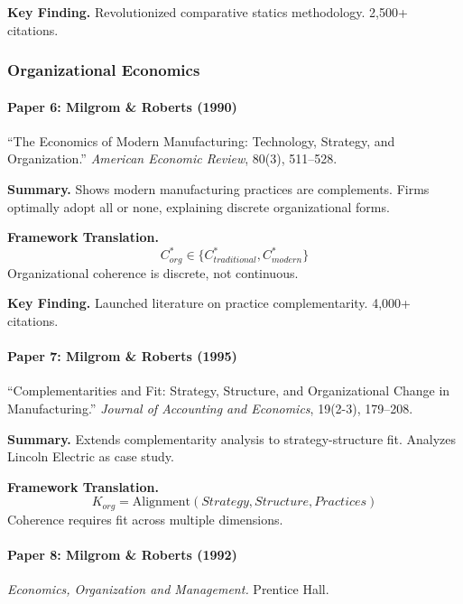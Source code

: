 \textbf{Key Finding.}
Revolutionized comparative statics methodology. 2,500+ citations.

\subsubsection{Organizational Economics}

\paragraph{Paper 6: Milgrom \& Roberts (1990)}

``The Economics of Modern Manufacturing: Technology, Strategy, and Organization.''
\textit{American Economic Review}, 80(3), 511--528.

\textbf{Summary.}
Shows modern manufacturing practices are complements. Firms optimally adopt 
all or none, explaining discrete organizational forms.

\textbf{Framework Translation.}
\begin{equation}
C^*_{org} \in \{C^*_{traditional}, C^*_{modern}\}
\end{equation}
Organizational coherence is discrete, not continuous.

\textbf{Key Finding.}
Launched literature on practice complementarity. 4,000+ citations.

\paragraph{Paper 7: Milgrom \& Roberts (1995)}

``Complementarities and Fit: Strategy, Structure, and Organizational Change in Manufacturing.''
\textit{Journal of Accounting and Economics}, 19(2-3), 179--208.

\textbf{Summary.}
Extends complementarity analysis to strategy-structure fit. 
Analyzes Lincoln Electric as case study.

\textbf{Framework Translation.}
\begin{equation}
K_{org} = \text{Alignment}(Strategy, Structure, Practices)
\end{equation}
Coherence requires fit across multiple dimensions.

\paragraph{Paper 8: Milgrom \& Roberts (1992)}

\textit{Economics, Organization and Management.}
Prentice Hall.

